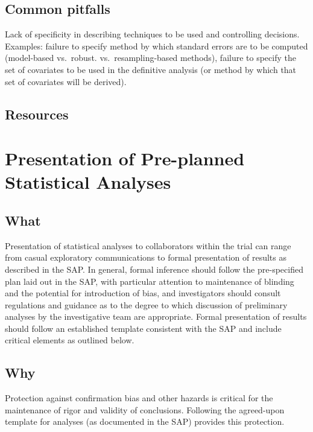 \documentclass[]{book}
\begin{document}
\subsection{Common pitfalls}\label{common-pitfalls-1}

Lack of specificity in describing techniques to be used and controlling
decisions. Examples: failure to specify method by which standard errors
are to be computed (model-based vs.~robust. vs.~resampling-based
methods), failure to specify the set of covariates to be used in the
definitive analysis (or method by which that set of covariates will be
derived).

\subsection{Resources}\label{resources-1}

\section{Presentation of Pre-planned Statistical
Analyses}\label{presentation-of-pre-planned-statistical-analyses}

\subsection{What}\label{what-4}

Presentation of statistical analyses to collaborators within the trial
can range from casual exploratory communications to formal presentation
of results as described in the SAP. In general, formal inference should
follow the pre-specified plan laid out in the SAP, with particular
attention to maintenance of blinding and the potential for introduction
of bias, and investigators should consult regulations and guidance as to
the degree to which discussion of preliminary analyses by the
investigative team are appropriate. Formal presentation of results
should follow an established template consistent with the SAP and
include critical elements as outlined below.

\subsection{Why}\label{why-4}

Protection against confirmation bias and other hazards is critical for
the maintenance of rigor and validity of conclusions. Following the
agreed-upon template for analyses (as documented in the SAP) provides
this protection.
\end{document}
